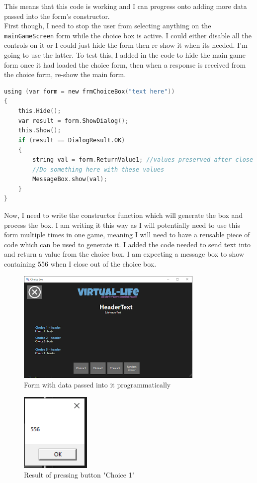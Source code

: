 \noindent This means that this code is working and I can progress onto adding more data passed into the form's constructor.\\
First though, I need to stop the user from selecting anything on the \verb|mainGameScreen| form while the choice box is active. I could either disable all the controls on it or I could just hide the form then re-show it when it\textquotesingle s needed. I'm going to use the latter. To test this, I added in the code to hide the main game form once it had loaded the choice form, then when a response is received from the choice form, re-show the main form.
\begin{lstlisting}[language=c, style=csharp, caption=Code which generates the choice box form and receives its response now with show and hide functions]
using (var form = new frmChoiceBox("text here"))
{
    this.Hide();
    var result = form.ShowDialog();
    this.Show();
    if (result == DialogResult.OK)
    {
        string val = form.ReturnValue1; //values preserved after close
        //Do something here with these values
        MessageBox.show(val);
    }
}
\end{lstlisting}
Now, I need to write the constructor function which will generate the box and process the box. I am writing it this way as I will potentially need to use this form multiple times in one game, meaning I will need to have a reusable piece of code which can be used to generate it.
I added the code needed to send text into and return a value from the choice box. I am expecting a message box to show containing 556 when I close out of the choice box.
\begin{figure}[H]
    \centering
    \includegraphics[width=0.8\textwidth]{images/implementation/choiceBox3a.png}
    \caption{Form with data passed into it programmatically}
    \label{fig:implementation-choiceBox3a}
\end{figure}
\begin{figure}[H]
    \centering
    \includegraphics[width=0.3\textwidth]{images/implementation/choiceBox3b.png}
    \caption{Result of pressing button "Choice 1"}
    \label{fig:implementation-choiceBox3b}
\end{figure}
